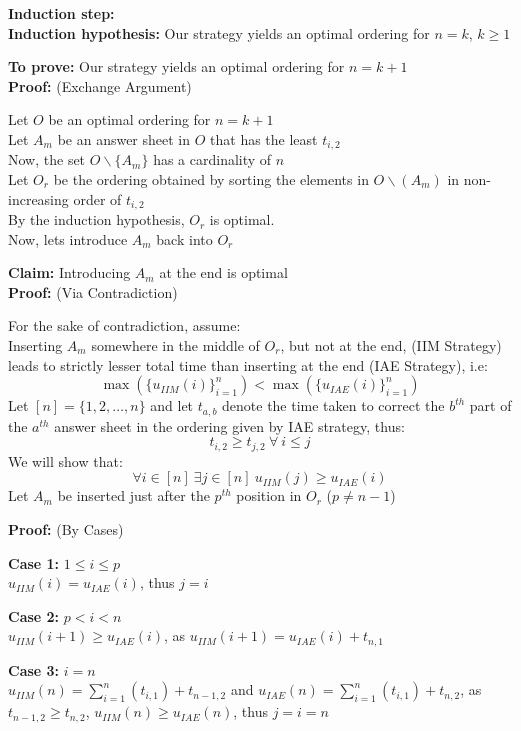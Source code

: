 \documentclass[11pt, fleqn]{article}
\begin{document}
\smallskip
\textbf{Induction step:}\\
\textbf{Induction hypothesis:} Our strategy yields an optimal ordering for $n = k$, $k \ge 1$

\smallskip
\textbf{To prove:} Our strategy yields an optimal ordering for $n = k+1$\\
\textbf{Proof:} (Exchange Argument)

\smallskip
Let $O$ be an optimal ordering for $n=k+1$\\
Let $A_m$ be an answer sheet in $O$ that has the least $t_{i,2}$\\
Now, the set $O\backslash\{A_m\}$ has a cardinality of $n$\\ Let $O_r$ be the ordering obtained by sorting the elements in $O\backslash(A_m)$ in non-increasing order of $t_{i,2}$\\
By the induction hypothesis, $O_r$ is optimal.\\
Now, lets introduce $A_m$ back into $O_r$

\medskip
\textbf{Claim:} Introducing $A_m$ at the end is optimal\\
\textbf{Proof:} (Via Contradiction)

\smallskip
For the sake of contradiction, assume:\\
Inserting $A_m$ somewhere in the middle of $O_r$, but not at the end, (IIM Strategy) leads to strictly lesser total time than inserting at the end (IAE Strategy), i.e:
$$
    \max{(\{u_{IIM}(i)\}_{i=1}^n)} < \max{(\{u_{IAE}(i)\}_{i=1}^n)}
$$
Let $[n] = \{1,2,\ldots,n\}$ and let $t_{a,b}$ denote the time taken to correct the $b^{th}$ part of the $a^{th}$ answer sheet in the ordering given by IAE strategy, thus:
$$ t_{i,2} \ge t_{j,2} \ \forall \ i \le j $$
We will show that: 
$$\forall i\in[n] \ \exists j \in [n] \ u_{IIM}(j) \ge u_{IAE}(i)$$
Let $A_m$ be inserted just after the $p^{th}$ position in $O_r$ ($p \neq n-1$)

\smallskip
\textbf{Proof:} (By Cases)

\smallskip
\textbf{Case 1:} $1 \le i \le p$\\
$u_{IIM}(i) = u_{IAE}(i)$, thus $j = i$

\smallskip
\textbf{Case 2:} $p < i < n$\\
$u_{IIM}(i+1) \ge u_{IAE}(i)$, as $u_{IIM}(i+1) = u_{IAE}(i) + t_{n, 1}$

\smallskip
\textbf{Case 3:} $i = n$\\
$u_{IIM}(n) = \sum_{i=1}^n(t_{i,1}) + t_{n-1, 2}$ and $u_{IAE}(n) = \sum_{i=1}^n(t_{i,1}) + t_{n, 2}$, as $t_{n-1,2} \ge t_{n,2}$, $u_{IIM}(n) \ge u_{IAE}(n)$, thus $j = i = n$
\end{document}
